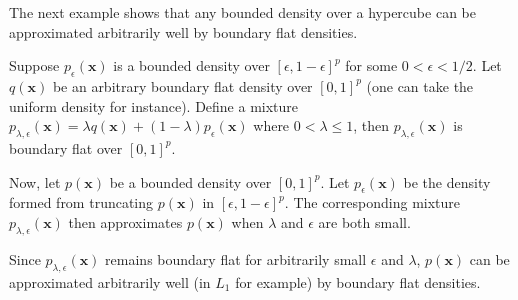 The next example shows that any bounded density over a hypercube can be approximated arbitrarily well by boundary flat densities. 

\begin{example}
\label{ex:mixture_approx}
Suppose $p_\epsilon(\mathbf{x})$ is a bounded density over $[\epsilon, 1-\epsilon]^p$ for some $0 < \epsilon < 1/2$. Let $q(\mathbf{x})$ be an arbitrary boundary flat density over $[0,1]^p$ (one can take the uniform density for instance). Define a mixture $p_{\lambda, \epsilon}(\mathbf{x}) = \lambda q(\mathbf{x}) + (1-\lambda) p_\epsilon(\mathbf{x})$ where $0 < \lambda \leq 1$, then $p_{\lambda, \epsilon}(\mathbf{x})$ is boundary flat over $[0,1]^p$. 

Now, let $p(\mathbf{x})$ be a bounded density over $[0,1]^p$. Let $p_\epsilon(\mathbf{x})$ be the density formed from truncating $p(\mathbf{x})$ in $[\epsilon, 1-\epsilon]^p$. The corresponding mixture $p_{\lambda,\epsilon}(\mathbf{x})$ then approximates $p(\mathbf{x})$ when $\lambda$ and $\epsilon$ are both small.

Since $p_{\lambda,\epsilon}(\mathbf{x})$ remains boundary flat for arbitrarily small $\epsilon$ and $\lambda$, $p(\mathbf{x})$ can be approximated arbitrarily well (in $L_1$ for example) by boundary flat densities. 
\end{example}






